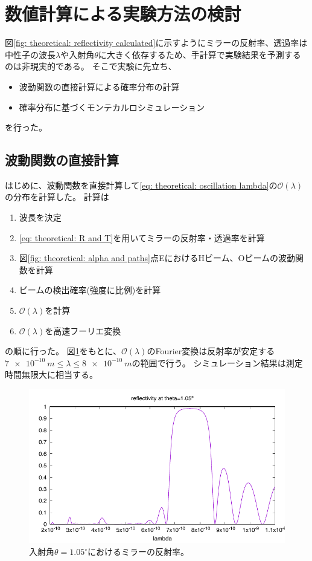 \documentclass[dvipdfmx]{jsarticle}
\begin{document}
\section{数値計算による実験方法の検討}

図\ref{fig: theoretical: reflectivity calculated}に示すようにミラーの反射率、透過率は中性子の波長$\lambda$や入射角$\theta$に大きく依存するため、手計算で実験結果を予測するのは非現実的である。
そこで実験に先立ち、
\begin{itemize}
    \item 波動関数の直接計算による確率分布の計算
    \item 確率分布に基づくモンテカルロシミュレーション
\end{itemize}
を行った。



\subsection{波動関数の直接計算}
\label{sec: simulate: theoretical}

はじめに、波動関数を直接計算して\eqref{eq: theoretical: oscillation lambda}の$\mathscr{O}(\lambda)$の分布を計算した。
計算は
\begin{enumerate}
    \item 波長を決定
    \item \eqref{eq: theoretical: R and T}を用いてミラーの反射率・透過率を計算
    \item 図\ref{fig: theoretical: alpha and paths}点EにおけるHビーム、Oビームの波動関数を計算
    \item ビームの検出確率(強度に比例)を計算
    \item $\mathscr{O}(\lambda)$を計算
    \item $\mathscr{O}(\lambda)$を高速フーリエ変換
\end{enumerate}
の順に行った。
図\ref{fig: simulate: reflectivity at theta 1.05}をもとに、$\mathscr{O}(\lambda)$のFourier変換は反射率が安定する$\SI{7e-10}{m}\leq\lambda\leq\SI{8e-10}{m}$の範囲で行う。
シミュレーション結果は測定時間無限大に相当する。

\begin{figure}
    \centering
    \includegraphics[width=0.6\linewidth]{img/reflNiTi-sim2.pdf}
    \caption{入射角$\theta=1.05^\circ$におけるミラーの反射率。}
    \label{fig: simulate: reflectivity at theta 1.05}
\end{figure}
\end{document}
